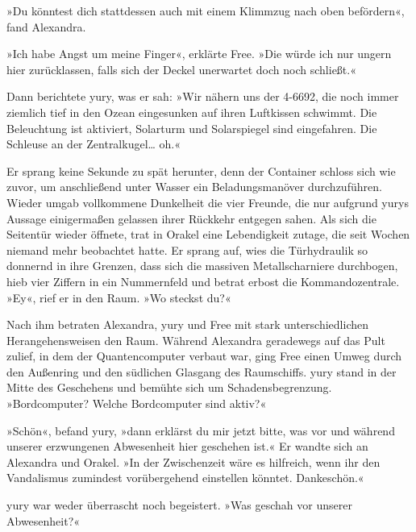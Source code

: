 »Du könntest dich stattdessen auch mit einem Klimmzug nach oben befördern«, fand Alexandra.

»Ich habe Angst um meine Finger«, erklärte Free. »Die würde ich nur ungern hier zurücklassen, falls sich der Deckel unerwartet doch noch schließt.«

Dann berichtete yury, was er sah: »Wir nähern uns der 4-6692, die noch immer ziemlich tief in den Ozean eingesunken auf ihren Luftkissen schwimmt. Die Beleuchtung ist aktiviert, Solarturm und Solarspiegel sind eingefahren. Die Schleuse an der Zentralkugel… oh.«

Er sprang keine Sekunde zu spät herunter, denn der Container schloss sich wie zuvor, um anschließend unter Wasser ein Beladungsmanöver durchzuführen. Wieder umgab vollkommene Dunkelheit die vier Freunde, die nur aufgrund yurys Aussage einigermaßen gelassen ihrer Rückkehr entgegen sahen. Als sich die Seitentür wieder öffnete, trat in Orakel eine Lebendigkeit zutage, die seit Wochen niemand mehr beobachtet hatte. Er sprang auf, wies die Türhydraulik so donnernd in ihre Grenzen, dass sich die massiven Metallscharniere durchbogen, hieb vier Ziffern in ein Nummernfeld und betrat erbost die Kommandozentrale. »Ey«, rief er in den Raum. »Wo steckst du?«

Nach ihm betraten Alexandra, yury und Free mit stark unterschiedlichen Herangehensweisen den Raum. Während Alexandra geradewegs auf das Pult zulief, in dem der Quantencomputer verbaut war, ging Free einen Umweg durch den Außenring und den südlichen Glasgang des Raumschiffs. yury stand in der Mitte des Geschehens und bemühte sich um Schadensbegrenzung. »Bordcomputer? Welche Bordcomputer sind aktiv?«


»Schön«, befand yury, »dann erklärst du mir jetzt bitte, was vor und während unserer erzwungenen Abwesenheit hier geschehen ist.« Er wandte sich an Alexandra und Orakel. »In der Zwischenzeit wäre es hilfreich, wenn ihr den Vandalismus zumindest vorübergehend einstellen könntet. Dankeschön.«


yury war weder überrascht noch begeistert. »Was geschah vor unserer Abwesenheit?«

